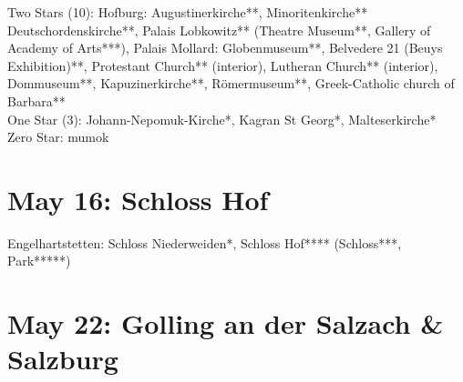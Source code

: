Two Stars (10): Hofburg: Augustinerkirche**, Minoritenkirche**   Deutschordenskirche**, Palais Lobkowitz** (Theatre Museum**, Gallery of Academy of Arts***), Palais Mollard: Globenmuseum**, Belvedere 21 (Beuys Exhibition)**, Protestant Church** (interior), Lutheran Church** (interior), Dommuseum**, Kapuzinerkirche**, R\"omermuseum**, Greek-Catholic church of Barbara**\\

One Star (3): Johann-Nepomuk-Kirche*, Kagran St Georg*, Malteserkirche*\\

Zero Star: mumok

\section{May 16: Schloss Hof}
\label{2021SchlossHof}

Engelhartstetten: Schloss Niederweiden*, Schloss Hof**** (Schloss***, Park*****)

\section{May 22: Golling an der Salzach \& Salzburg}
\label{2021GollingSalzburg}

